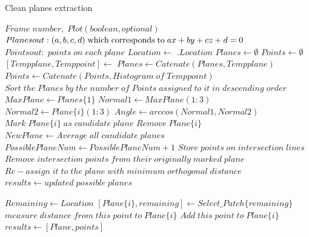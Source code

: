 \documentclass[10pt,a4paper]{article}
\begin{document}
\begin{algorithm}  
	\caption{Clean planes extraction} 
	\label{alg:plane} 
	\begin{algorithmic}[1]  
		\Require $Frame\; number, \; Plot(boolean, optional)$ 
		\Ensure $Planesout:(a,b,c,d){\rm{\; which\; corresponds \;to\; }}ax + by + cz + d = 0 \qquad \qquad$
		\Ensure $ Pointsout: \;points \;on \;each \;plane$  
		\State $Location \gets$ $.Location$
		\State $Planes \gets \emptyset$
		\State $Points \gets \emptyset$
		\State $[Tempplane, Temppoint] \gets$ 
		\State $Planes \gets Catenate(Planes,Tempplane)$
        \State $Points \gets Catenate(Points,Histogram \;of \;Temppoint)$		
		\EndFor
		\State $Sort \;the \;Planes \;by \;the \;number \;of\; Points \;assigned \;to \;it \;in \;descending \;order$
		\State $MaxPlane \gets Planes\{1\}$
        \State $Normal1 \gets MaxPlane(1:3)$ 
        \State $Normal2 \gets Plane\{i\}(1:3)$ 
        \State $Angle \gets arccos(Normal1,Normal2)$	
        $Mark\; Plane\{i\} \;as\; candidate\; plane$
        $Remove\; Plane\{i\}$
        \EndIf	
        \EndFor	
        \State $NewPlane \gets Average \;all\;candidate \;planes$
        \State $PossiblePlaneNum \gets PossiblePlaneNum + 1$
        \EndFor
        \State $Store \;points \;on \;intersection \;lines$
        \State $Remove \;intersection \;points \;from \;their \;originally \;marked \;plane$
        \EndFor	
        \State $Re-assign \;it \;to \;the\;plane \;with \;minimum \;orthogonal \;distance$
        \EndFor
		\State $results\gets updated\; possible \;planes$         
		\State {}  
		\EndFunction  
		
		
		\State  
		\State $Remaining  \gets Location $  
		\State $[Plane\{i\}, remaining] \gets Select\_Patch\{remaining\}$  
		\State $measure \;distance \;from \;this \;point \;to \;Plane \{i\}$
		\State $Add \;this \;point \;to \;Plane \{i\}$
		\EndIf
		\EndFor
		\EndFor
		\State $results\gets [Plane, points]$
		\State {}  
		
		\EndFunction  

		
	\end{algorithmic}  
\end{algorithm}  
\end{document}
